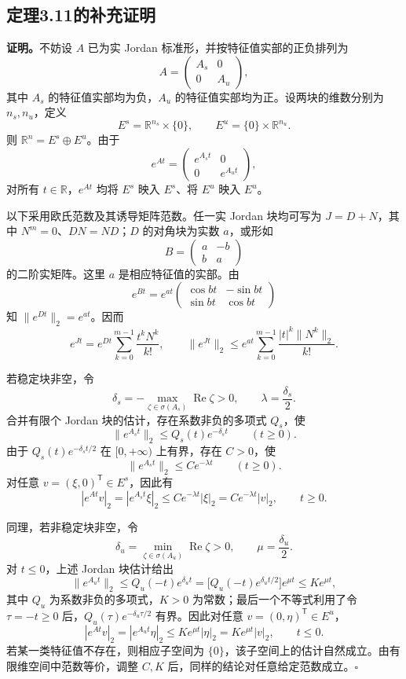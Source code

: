 \documentclass[11pt,a4paper]{ctexart}
\newcommand{\R}{\mathbb R}\newcommand{\C}{\mathbb C}
\begin{document}
\subsection*{定理3.11的补充证明}
\textbf{证明。}不妨设 $A$ 已为实 Jordan 标准形，并按特征值实部的正负排列为
\[
A=\begin{pmatrix}A_s&0\\0&A_u\end{pmatrix},
\]
其中 $A_s$ 的特征值实部均为负，$A_u$ 的特征值实部均为正。设两块的维数分别为 $n_s,n_u$，定义
\[
E^s=\R^{n_s}\times\{0\},\qquad E^u=\{0\}\times\R^{n_u}.
\]
则 $\R^n=E^s\oplus E^u$。由于
\[
e^{At}=\begin{pmatrix}e^{A_st}&0\\0&e^{A_ut}\end{pmatrix},
\]
对所有 $t\in\R$，$e^{At}$ 均将 $E^s$ 映入 $E^s$、将 $E^u$ 映入 $E^u$。

以下采用欧氏范数及其诱导矩阵范数。任一实 Jordan 块均可写为 $J=D+N$，其中 $N^m=0$、$DN=ND$；$D$ 的对角块为实数 $a$，或形如
\[
B=\begin{pmatrix}a&-b\\b&a\end{pmatrix}
\]
的二阶实矩阵。这里 $a$ 是相应特征值的实部。由
\[
e^{Bt}=e^{at}\begin{pmatrix}\cos bt&-\sin bt\\\sin bt&\cos bt\end{pmatrix}
\]
知 $\|e^{Dt}\|_2=e^{at}$。因而
\[
e^{Jt}=e^{Dt}\sum_{k=0}^{m-1}\frac{t^kN^k}{k!},\qquad
\|e^{Jt}\|_2\le e^{at}\sum_{k=0}^{m-1}\frac{|t|^k\|N^k\|_2}{k!}.
\]

若稳定块非空，令
\[
\delta_s=-\max_{\zeta\in\sigma(A_s)}\operatorname{Re}\zeta>0,
\qquad \lambda=\frac{\delta_s}{2}.
\]
合并有限个 Jordan 块的估计，存在系数非负的多项式 $Q_s$，使
\[
\|e^{A_st}\|_2\le Q_s(t)e^{-\delta_st}\qquad(t\ge0).
\]
由于 $Q_s(t)e^{-\delta_st/2}$ 在 $[0,+\infty)$ 上有界，存在 $C>0$，使
\[
\|e^{A_st}\|_2\le Ce^{-\lambda t}\qquad(t\ge0).
\]
对任意 $v=(\xi,0)^{\mathsf T}\in E^s$，因此有
\[
|e^{At}v|_2=|e^{A_st}\xi|_2
\le Ce^{-\lambda t}|\xi|_2
=Ce^{-\lambda t}|v|_2,\qquad t\ge0.
\]

同理，若非稳定块非空，令
\[
\delta_u=\min_{\zeta\in\sigma(A_u)}\operatorname{Re}\zeta>0,
\qquad\mu=\frac{\delta_u}{2}.
\]
对 $t\le0$，上述 Jordan 块估计给出
\[
\|e^{A_ut}\|_2\le Q_u(-t)e^{\delta_ut}
=\bigl[Q_u(-t)e^{\delta_ut/2}\bigr]e^{\mu t}
\le Ke^{\mu t},
\]
其中 $Q_u$ 为系数非负的多项式，$K>0$ 为常数；最后一个不等式利用了令 $\tau=-t\ge0$ 后，$Q_u(\tau)e^{-\delta_u\tau/2}$ 有界。因此对任意 $v=(0,\eta)^{\mathsf T}\in E^u$，
\[
|e^{At}v|_2=|e^{A_ut}\eta|_2
\le Ke^{\mu t}|\eta|_2
=Ke^{\mu t}|v|_2,\qquad t\le0.
\]
若某一类特征值不存在，则相应子空间为 $\{0\}$，该子空间上的估计自然成立。由有限维空间中范数等价，调整 $C,K$ 后，同样的结论对任意给定范数成立。\hfill$\square$
\end{document}
